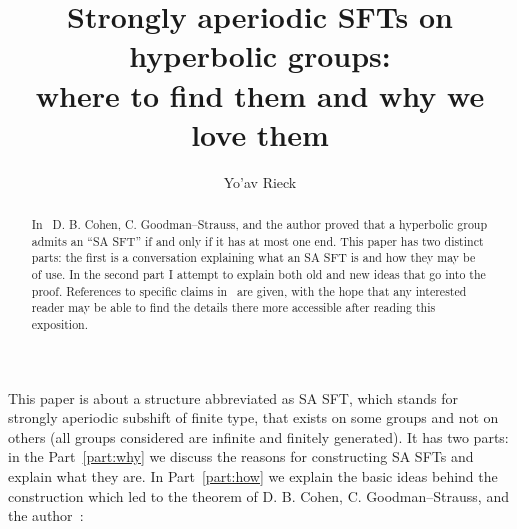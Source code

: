 \documentclass[12pt,reqno]{amsart}
\theoremstyle{plain}
\theoremstyle{definition}
\numberwithin{subcase}{case}
\theoremstyle{plain}
\theoremstyle{definition}
\begin{document}

\title[SA SFTs on hyperbolic groups]{Strongly aperiodic SFTs on hyperbolic groups: \\ where to find them and why we love them}

\author[Yo'av Rieck]{Yo'av Rieck}
\address{Dept.\ of Mathematics \\
  University of Arkansas\\
  Fayetteville, AR 72701}

\begin{abstract}
In~\cite{cohen_goodman-strauss_rieck_2021} D. B. Cohen, C. Goodman--Strauss, and the author  proved that a hyperbolic group admits an ``SA SFT'' if and only if it has at most one end. This paper has two distinct parts: the first is a conversation explaining what an SA SFT is and how they may be of use. In the second part I attempt to explain  both old and new ideas that go into the proof. References to specific claims in~\cite{cohen_goodman-strauss_rieck_2021} are given, with the hope that any interested reader may be able to find the details there more accessible after reading this exposition.
\end{abstract}

\clearpage\maketitle
\thispagestyle{empty}

%  
%


This paper is about a structure abbreviated as SA SFT, which stands for strongly aperiodic subshift of finite type, that exists on some groups and not on others (all groups considered are infinite and finitely generated).  It has two parts: in the Part~\ref{part:why} we discuss the reasons for constructing SA SFTs and explain what they are. In Part~\ref{part:how} we explain the basic ideas behind the construction which led to the theorem of D. B. Cohen, C. Goodman--Strauss, and the author~\cite{cohen_goodman-strauss_rieck_2021}:
\end{document}
